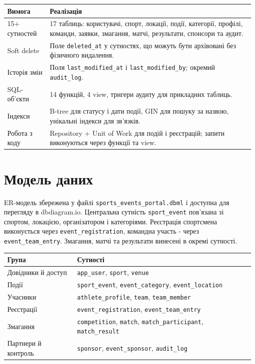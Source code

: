 \documentclass[12pt,a4paper]{article}
\begin{document}
\begin{longtable}{p{}p{}}
\toprule
\textbf{Вимога} & \textbf{Реалізація}\\
\midrule
15+ сутностей & 17 таблиць: користувачі, спорт, локації, події, категорії, профілі, команди, заявки, змагання, матчі, результати, спонсори та аудит.\\
Soft delete & Поле \texttt{deleted\_at} у сутностях, що можуть бути архівовані без фізичного видалення.\\
Історія змін & Поля \texttt{last\_modified\_at} і \texttt{last\_modified\_by}; окремий \texttt{audit\_log}.\\
SQL-об'єкти & 14 функцій, 4 view, тригери аудиту для прикладних таблиць.\\
Індекси & B-tree для статусу і дати події, GIN для пошуку за назвою, унікальні індекси для зв'язків.\\
Робота з коду & Repository + Unit of Work для подій і реєстрацій; запити виконуються через функції та view.\\
\bottomrule
\end{longtable}

\section{Модель даних}

ER-модель збережена у файлі \texttt{sports\_events\_portal.dbml} і доступна для перегляду в dbdiagram.io. Центральна сутність \texttt{sport\_event} пов'язана зі спортом, локацією, організатором і категоріями. Реєстрація спортсмена виконується через \texttt{event\_registration}, командна участь - через \texttt{event\_team\_entry}. Змагання, матчі та результати винесені в окремі сутності.

\begin{table}[H]
\centering
\small
\begin{tabular}{p{}p{}}
\toprule
\textbf{Група} & \textbf{Сутності}\\
\midrule
Довідники й доступ & \texttt{app\_user}, \texttt{sport}, \texttt{venue}\\
Події & \texttt{sport\_event}, \texttt{event\_category}, \texttt{event\_location}\\
Учасники & \texttt{athlete\_profile}, \texttt{team}, \texttt{team\_member}\\
Реєстрації & \texttt{event\_registration}, \texttt{event\_team\_entry}\\
Змагання & \texttt{competition}, \texttt{match}, \texttt{match\_participant}, \texttt{match\_result}\\
Партнери й контроль & \texttt{sponsor}, \texttt{event\_sponsor}, \texttt{audit\_log}\\
\bottomrule
\end{tabular}
\end{table}
\end{document}

